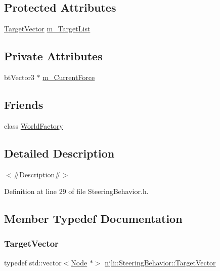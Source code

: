 \subsection*{Protected Attributes}
\begin{DoxyCompactItemize}
\item 
\mbox{\hyperlink{classnjli_1_1_steering_behavior_ab7a7224d97d2e392e5ae75108a6c160a}{Target\+Vector}} \mbox{\hyperlink{classnjli_1_1_steering_behavior_a48a4deef579ab968bdd4ecf0ba0c8668}{m\+\_\+\+Target\+List}}
\end{DoxyCompactItemize}
\subsection*{Private Attributes}
\begin{DoxyCompactItemize}
\item 
bt\+Vector3 $\ast$ \mbox{\hyperlink{classnjli_1_1_steering_behavior_a9148bc145f9bc1943d6c40fe263fcb29}{m\+\_\+\+Current\+Force}}
\end{DoxyCompactItemize}
\subsection*{Friends}
\begin{DoxyCompactItemize}
\item 
class \mbox{\hyperlink{classnjli_1_1_steering_behavior_acb96ebb09abe8f2a37a915a842babfac}{World\+Factory}}
\end{DoxyCompactItemize}


\subsection{Detailed Description}
$<$\#\+Description\#$>$ 

Definition at line 29 of file Steering\+Behavior.\+h.



\subsection{Member Typedef Documentation}
\mbox{\label{classnjli_1_1_steering_behavior_ab7a7224d97d2e392e5ae75108a6c160a}} 
\subsubsection{\texorpdfstring{Target\+Vector}{TargetVector}}
{\footnotesize\ttfamily typedef std\+::vector$<$\mbox{\hyperlink{classnjli_1_1_node}{Node}} $\ast$$>$ \mbox{\hyperlink{classnjli_1_1_steering_behavior_ab7a7224d97d2e392e5ae75108a6c160a}{njli\+::\+Steering\+Behavior\+::\+Target\+Vector}}\hspace{0.3cm}{\ttfamily [protected]}}




